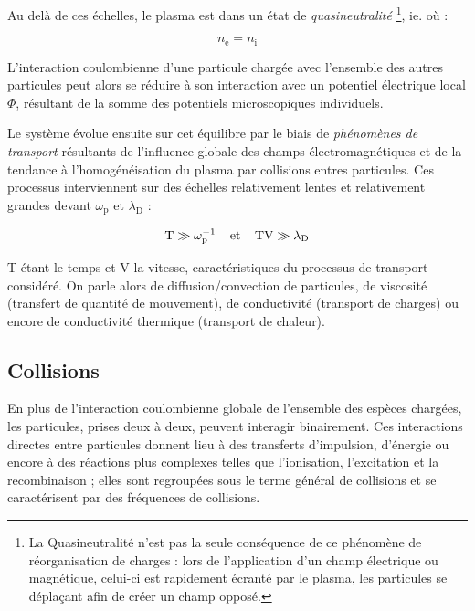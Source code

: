 \begin{refsection}
Au delà de ces échelles, le plasma est dans un état de \emph{quasineutralité}
\footnote{La Quasineutralité n'est pas la seule conséquence de ce phénomène de réorganisation
de charges : lors de l'application d'un champ électrique ou magnétique, celui-ci est rapidement
écranté par le plasma, les particules se
déplaçant afin de créer un champ opposé.}, 
ie. où :

\begin{equation}
n_\text{e}=n_\text{i}
\label{quasineutralité}
\end{equation}

L'interaction coulombienne d'une particule chargée avec l'ensemble des autres particules peut alors
se réduire à son interaction avec un potentiel électrique local $\Phi$,
résultant de la somme des potentiels microscopiques individuels.

Le système évolue ensuite sur cet équilibre par le biais de
\emph{phénomènes de transport} résultants de l'influence
globale des champs électromagnétiques et de la tendance à
l'homogénéisation du plasma par collisions entres particules.
Ces processus interviennent sur des échelles relativement
lentes et relativement grandes devant $\omega_\text{p}$ et $\lambda_\text{D}$ :

\begin{equation}
\text{T}\gg \omega_\text{p}^{{-1}}
\;\;\;\;\text{et}\;\;\;\;\text{TV}\gg\lambda_\text{D}
\end{equation}

$\text{T}$ étant le temps et $\text{V} $ la vitesse, caractéristiques du
processus de transport considéré.
On parle alors de diffusion/convection de particules, de viscosité (transfert de
quantité de mouvement), de conductivité (transport de charges) ou encore de
conductivité thermique (transport de chaleur).

\subsection{Collisions}
\label{1-Collisions}
En plus de l'interaction coulombienne globale de l'ensemble des espèces chargées, 
les particules, prises deux à deux, peuvent interagir binairement. 
Ces interactions directes entre particules donnent lieu à des transferts
d'impulsion, d'énergie ou encore à des réactions plus complexes telles que
l'ionisation, l'excitation et la recombinaison ; elles sont regroupées
sous le terme général de collisions et se caractérisent par des fréquences de
collisions.


\end{refsection}
